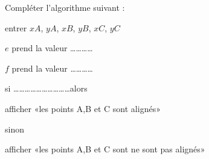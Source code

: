 
\begin{exercice}\label{exosmath-0577}

    Compléter l'algorithme suivant :

\begin{fmpage}{0.9\linewidth}

    entrer \( xA\), \( yA\), \( xB\), \( yB\), \( xC\), \( yC\)

    \( e\) prend la valeur \ldots\ldots\ldots\ldots

    \( f\) prend la valeur \ldots\ldots\ldots\ldots

    si \ldots\ldots\ldots\ldots\ldots\ldots\ldots\ldots\ldots\ldots   alors

    \hspace{1cm} afficher «les points A,B et C sont alignés» 

    sinon

    \hspace{1cm} afficher «les points A,B et C sont ne sont pas alignés» 

\end{fmpage}


\end{exercice}
